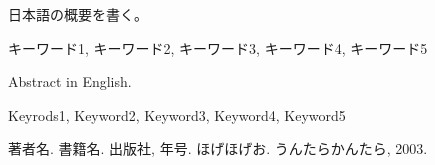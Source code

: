 \documentclass[openany,11pt,papersize,dvipdfm]{jsbook}
\begin{document}
%
\maketitle

\frontmatter

\begin{jabstract} 日本語の概要を書く。
\begin{jkeyword}
キーワード1, キーワード2, キーワード3, キーワード4, キーワード5
\end{jkeyword}
\end{jabstract}

\begin{eabstract} Abstract in English. 
\begin{ekeyword}
Keyrods1, Keyword2, Keyword3, Keyword4, Keyword5
\end{ekeyword}
\end{eabstract}

\tableofcontents%

\mainmatter%




\begin{appendix}



\end{appendix}


\begin{thebibliography}{9}
  著者名. 書籍名. 出版社,  年号.
  ほげほげお. うんたらかんたら,  2003.
\end{thebibliography}
\end{document}
